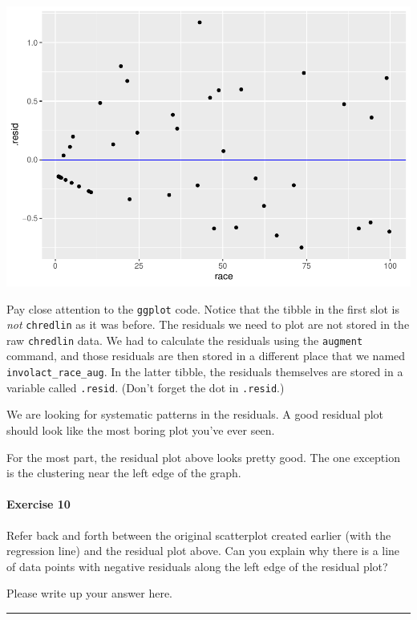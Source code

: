 \documentclass[
]{book}
\begin{document}
\includegraphics{intro_stats_files/figure-latex/unnamed-chunk-190-1.pdf}

Pay close attention to the \texttt{ggplot} code. Notice that the tibble in the first slot is \emph{not} \texttt{chredlin} as it was before. The residuals we need to plot are not stored in the raw \texttt{chredlin} data. We had to calculate the residuals using the \texttt{augment} command, and those residuals are then stored in a different place that we named \texttt{involact\_race\_aug}. In the latter tibble, the residuals themselves are stored in a variable called \texttt{.resid}. (Don't forget the dot in \texttt{.resid}.)

We are looking for systematic patterns in the residuals. A good residual plot should look like the most boring plot you've ever seen.

For the most part, the residual plot above looks pretty good. The one exception is the clustering near the left edge of the graph.

\hypertarget{exercise-10-3}{%
\paragraph*{Exercise 10}\label{exercise-10-3}}

Refer back and forth between the original scatterplot created earlier (with the regression line) and the residual plot above. Can you explain why there is a line of data points with negative residuals along the left edge of the residual plot?

Please write up your answer here.

\begin{center}\rule{0.5\linewidth}{0.5pt}\end{center}
\end{document}
